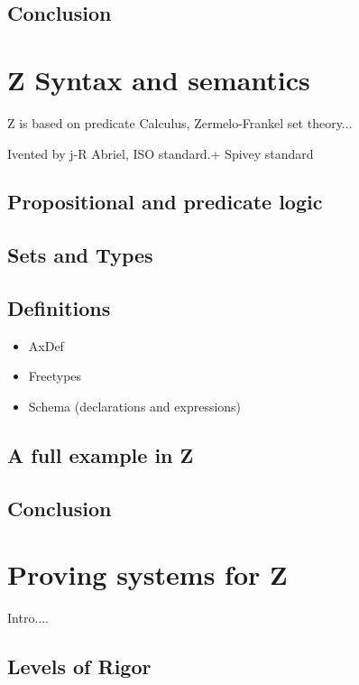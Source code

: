 \subsection{Conclusion}

\section{Z Syntax and semantics}

Z is based on predicate Calculus, Zermelo-Frankel set theory...

Ivented by j-R Abriel, ISO standard.+ Spivey standard

\subsection{Propositional and predicate logic}

\subsection{Sets and Types}

\subsection{Definitions}

\begin{itemize}
\item AxDef
\item Freetypes
\item Schema (declarations and expressions)
\end{itemize}

\subsection{A full example in Z}


\subsection{Conclusion}

\section{Proving systems for Z}

Intro....

\subsection{Levels of Rigor}

